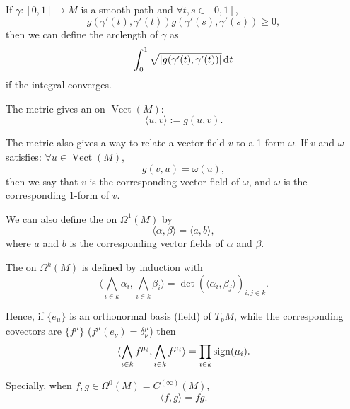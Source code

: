 \documentclass[openany, oneside, a5paper]{book}
\DeclareMathOperator{\Vect}{Vect}
\begin{document}
If $\gamma \colon [0, 1] \to M$ is a smooth path and $\forall t, s \in [0, 1]$,
\begin{equation}
    g(\gamma'(t), \gamma'(t)) g(\gamma'(s), \gamma'(s)) \geq 0,
\end{equation}
then we can define the arclength of $\gamma$ as
\begin{equation}
    \int_0^1 \sqrt{|g(\gamma'(t), \gamma'(t))|} \mathop{}\!\mathrm{d}^{} t
\end{equation}
if the integral converges.

The metric gives an  on $\Vect(M)$:
\begin{equation}
    \langle u, v \rangle := g(u, v).
\end{equation}

The metric also gives a way to relate a vector field $v$ to a 1-form $\omega$.
If $v$ and $\omega$ satisfies:
$\forall u \in \Vect(M)$, 
\begin{equation}
    g(v, u) = \omega(u),
\end{equation}
then we say that $v$ is the corresponding vector field of $\omega$, and $\omega$ is the corresponding 1-form of $v$.

We can also define the  on $\Omega^1(M)$ by 
\begin{equation}
    \langle \alpha, \beta\rangle = \langle a, b\rangle,
\end{equation}
where $a$ and $b$ is the corresponding vector fields of $\alpha$ and $\beta$.

The  on $\Omega^k(M)$ is defined by induction with
\begin{equation}
    \langle \bigwedge_{i \in k} \alpha_i, \bigwedge_{i \in k} \beta_i \rangle 
    = \det(\langle \alpha_i, \beta_j \rangle)_{i, j \in k}.
\end{equation}

Hence, if $\{e_\mu\}$ is an orthonormal basis (field) of $T_p M$, while the corresponding covectors are $\{f^\mu\}$ ($f^\mu(e_\nu) = \delta^\mu_\nu$) then
\begin{equation}
    \langle \bigwedge_{i \in k} f^{\mu_i}, \bigwedge_{i \in k} f^{\mu_i}\rangle
    = \prod_{i \in k} \operatorname{sign}(\mu_i).
\end{equation}

Specially, when $f, g \in \Omega^0(M) = C^{(\infty)}(M)$,
\begin{equation}
    \langle f, g \rangle = fg.
\end{equation}
\end{document}
